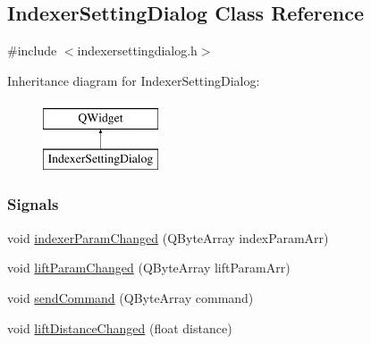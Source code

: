 \hypertarget{classIndexerSettingDialog}{}\subsection{Indexer\+Setting\+Dialog Class Reference}
\label{classIndexerSettingDialog}


{\ttfamily \#include $<$indexersettingdialog.\+h$>$}

Inheritance diagram for Indexer\+Setting\+Dialog\+:\begin{figure}[H]
\begin{center}
\leavevmode
\includegraphics[height=2.000000cm]{classIndexerSettingDialog}
\end{center}
\end{figure}
\subsubsection*{Signals}
\begin{DoxyCompactItemize}
\item 
void \mbox{\hyperlink{classIndexerSettingDialog_a231edf60936e09b15972951f8a7751e7}{indexer\+Param\+Changed}} (Q\+Byte\+Array index\+Param\+Arr)
\item 
void \mbox{\hyperlink{classIndexerSettingDialog_a40d9bb1a05d0afb9bb8a0191f611d78c}{lift\+Param\+Changed}} (Q\+Byte\+Array lift\+Param\+Arr)
\item 
void \mbox{\hyperlink{classIndexerSettingDialog_adbccfa0b79b30c4a5373e183f7828524}{send\+Command}} (Q\+Byte\+Array command)
\item 
void \mbox{\hyperlink{classIndexerSettingDialog_a8d5a19a8948b46f84de79d40775f05c5}{lift\+Distance\+Changed}} (float distance)
\end{DoxyCompactItemize}
